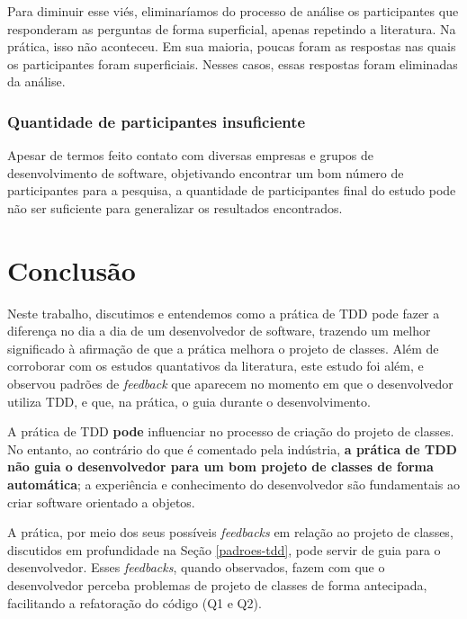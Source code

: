 \documentclass[conference]{IEEEtran}
\begin{document}
Para diminuir esse viés, eliminaríamos do processo de análise os participantes
que responderam as perguntas de forma superficial, apenas repetindo a literatura. Na prática,
isso não aconteceu. Em sua maioria, poucas foram as respostas nas quais os participantes
foram superficiais. Nesses casos, essas respostas foram eliminadas da análise.

\subsubsection{Quantidade de participantes insuficiente}

Apesar de termos feito contato
com diversas empresas e grupos de desenvolvimento de software,
objetivando encontrar um bom número de participantes para a pesquisa,
a quantidade de participantes final do estudo pode não ser suficiente para generalizar
os resultados encontrados. 

\section{Conclusão}

Neste trabalho, discutimos e entendemos como a prática de TDD pode
fazer a diferença no dia a dia de um desenvolvedor de software,
trazendo um melhor significado à afirmação de que a prática melhora o projeto de classes.
Além de corroborar com os estudos quantativos da literatura, este estudo
foi além, e observou padrões de \textit{feedback} que aparecem
no momento em que o desenvolvedor utiliza TDD, e que, na prática, o guia durante
o desenvolvimento.

A prática de TDD \textbf{pode} influenciar no processo de criação do projeto de classes.
No entanto, ao contrário do que é comentado pela indústria,
\textbf{a prática de TDD não guia o desenvolvedor para um bom projeto de classes
de forma automática}; a experiência e conhecimento 
do desenvolvedor são fundamentais ao criar software orientado a objetos.

A prática, por meio dos seus possíveis \textit{feedbacks} em relação ao
projeto de classes, discutidos
em profundidade na Seção \ref{padroes-tdd}, pode servir de guia
para o desenvolvedor. Esses \textit{feedbacks}, quando observados, fazem
com que o desenvolvedor perceba problemas de projeto de classes de
forma antecipada, facilitando a refatoração do código (Q1 e Q2).
\end{document}
